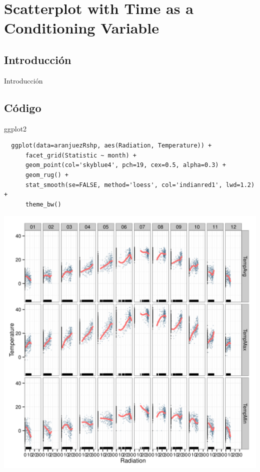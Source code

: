 \documentclass[xcolor={usenames,svgnames,dvipsnames}]{beamer}
\begin{document}
\section{Scatterplot with Time as a Conditioning Variable}
\label{sec-5}

\subsection{Introducción}
\label{sec-5-1}

\begin{frame}[label=sec-5-1-1]{Introducción}
\end{frame}

\subsection{Código}
\label{sec-5-2}

\begin{frame}[fragile,label=sec-5-2-1]{ggplot2}
 \lstset{language=R,label= ,caption= ,numbers=none}
\begin{lstlisting}
  ggplot(data=aranjuezRshp, aes(Radiation, Temperature)) +
      facet_grid(Statistic ~ month) +
      geom_point(col='skyblue4', pch=19, cex=0.5, alpha=0.3) +
      geom_rug() +
      stat_smooth(se=FALSE, method='loess', col='indianred1', lwd=1.2) +
      theme_bw()
\end{lstlisting}
\end{frame}

\begin{frame}[label=sec-5-2-2]{}
\includegraphics[width=.9\linewidth]{figs/aranjuezFacetGrid.png}
\end{frame}
\end{document}
